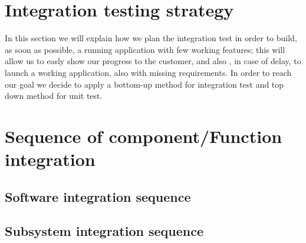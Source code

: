 \section{Integration testing strategy}
In this section we will explain how we plan the integration test
in order to build, as soon as possible, a running application 
with few working features; this will allow us to easly show
our progress to the customer, and also , in case of delay, 
to launch a working application, also with missing requirements.
In order to reach our goal we decide to apply a bottom-up method
for integration test and top down method for unit test.

\section{Sequence of component/Function integration}

\subsection{Software integration sequence}

\subsection{Subsystem integration sequence}

